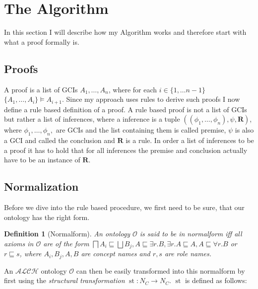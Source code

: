 \documentclass[titlepage]{article}
\newtheorem{definition}{Definition}
\DeclareMathOperator{\st}{st}
\begin{document}
\section{The Algorithm}
In this section I will describe how my Algorithm works and therefore start with what a
proof formally is.

\subsection{Proofs}
A proof is a list of GCIs $A_1, \ldots, A_n$, where for each $i \in \{1, \ldots n - 1\}
$ $\{A_1, \ldots, A_i\} \models A_{i+1}$. Since my approach uses rules to derive such
proofs I now define a rule based definition of a proof. A rule based proof is not a list
of GCIs but rather a list of inferences, where a inference is a tuple $((\phi_1, \ldots, \phi_n), \psi, \mathbf{R})$,
where $\phi_1, \ldots, \phi_n,$ are GCIs and the list containing them is called premise, $\psi$ is also a GCI
and called the conclusion and $\mathbf{R}$ is a rule. In order a list of inferences
to be a proof it has to hold that for all inferences the premise and conclusion actually have to be an 
instance of $\mathbf{R}$.

\subsection{Normalization}\label{alg:norm}
Before we dive into the rule based procedure, we first need to be sure, that our ontology has the right form.
\begin{definition}[Normalform]
  An ontology $\mathcal{O}$ is said to be in normalform iff all axioms in $\mathcal{O}$ are of the form
  $\bigsqcap A_i \sqsubseteq \bigsqcup B_j, A \sqsubseteq \exists r.B, \exists r.A \sqsubseteq A, A \sqsubseteq \forall r.B$ 
  or $r \sqsubseteq s$, where $A_i, B_j, A, B $ are concept names and $r,s$ are role names.
\end{definition}
An $\mathcal{ALCH}$ ontology $\mathcal{O}$ can then be easily transformed into this normalform by first 
using the
\emph{structural transformation} $\st: N_C \rightarrow N_C$. $\st$ is defined as follows:
\end{document}
